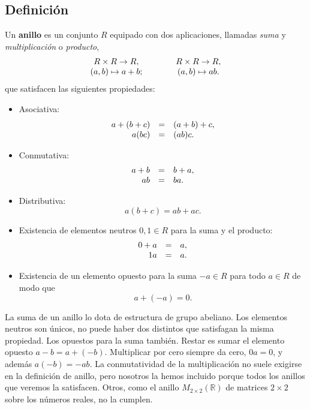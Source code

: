 \hypertarget{definiciuxf3n}{%
\subsection{Definición}\label{definiciuxf3n}}


Un \textbf{anillo} es un conjunto \(R\) equipado con dos aplicaciones,
llamadas \emph{suma} y \emph{multiplicación} o \emph{producto}, \[
\begin{array}{ccc}
R\times R\rightarrow R, &\qquad& R\times R\rightarrow R,\cr
(a,b)\mapsto a+b;&&(a,b) \mapsto ab.
\end{array}
\] que satisfacen las siguientes propiedades:

\begin{itemize}
\item
  Asociativa: \[
  \begin{array}{rcl}
  a+(b+c)&=&(a+b)+c,\cr 
  a(bc)&=&(ab)c.
  \end{array}
  \]
\item
  Conmutativa: \[
  \begin{array}{rcl}
  a+b&=&b+a,\cr 
  ab&=&ba.
  \end{array}
  \]
\item
  Distributiva: \[a(b+c)=ab+ac.\]
\item
  Existencia de elementos neutros \(0,1\in R\) para la suma y el
  producto: \[
  \begin{array}{rcl}
  0+a&=&a,\cr 
  1a&=&a.
  \end{array}
  \]
\item
  Existencia de un elemento opuesto para la suma \(-a\in R\) para todo
  \(a\in R\) de modo que \[a+(-a)=0.\]
\end{itemize}



La suma de un anillo lo dota de estructura de grupo abeliano. Los
elementos neutros son únicos, no puede haber dos distintos que
satisfagan la misma propiedad. Los opuestos para la suma también. Restar
es sumar el elemento opuesto \(a-b=a+(-b)\). Multiplicar por cero
siempre da cero, \(0a=0\), y además \(a(-b)=-ab\). La conmutatividad de
la multiplicación no suele exigirse en la definición de anillo, pero
nosotros la hemos incluido porque todos los anillos que veremos la
satisfacen. Otros, como el anillo \(M_{2\times 2}(\mathbb R)\) de
matrices \(2\times 2\) sobre los números reales, no la cumplen.

